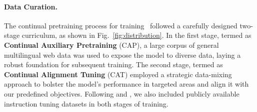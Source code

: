 




\paragraph{Data Curation.} The continual pretraining process for training \system\ followed a carefully designed two-stage curriculum, as shown in Fig.~\ref{fig:distribution}.
In the first stage, termed as \textbf{Continual Auxiliary Pretraining} (CAP), a large corpus of general multilingual web data was used to expose the model to diverse data, laying a robust foundation for subsequent training. The second stage, termed as \textbf{Continual Alignment Tuning} (CAT) employed a strategic data-mixing approach to bolster the model's performance in targeted areas and align it with our predefined objectives. Following \citet{taylor2022galactica} and \citet{Li2021Colossal}, we also included publicly available instruction tuning datasets in both stages of training. 

